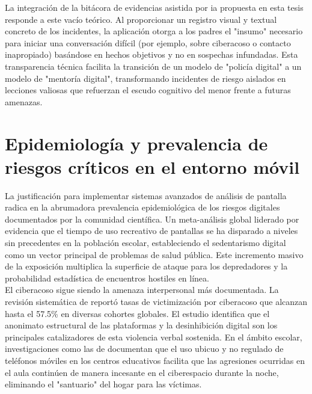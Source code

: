 La integración de la bitácora de evidencias asistida por \gls{ia} propuesta en esta tesis responde a este vacío teórico. Al proporcionar un registro visual y textual concreto de los incidentes, la aplicación otorga a los padres el "insumo" necesario para iniciar una conversación difícil (por ejemplo, sobre ciberacoso o contacto inapropiado) basándose en hechos objetivos y no en sospechas infundadas. Esta transparencia técnica facilita la transición de un modelo de "policía digital" a un modelo de "mentoría digital", transformando incidentes de riesgo aislados en lecciones valiosas que refuerzan el escudo cognitivo del menor frente a futuras amenazas.\\

\section{Epidemiología y prevalencia de riesgos críticos en el entorno móvil}

La justificación para implementar sistemas avanzados de análisis de pantalla radica en la abrumadora prevalencia epidemiológica de los riesgos digitales documentados por la comunidad científica. Un meta-análisis global liderado por \cite{mcarthur_global_2022} evidencia que el tiempo de uso recreativo de pantallas se ha disparado a niveles sin precedentes en la población escolar, estableciendo el sedentarismo digital como un vector principal de problemas de salud pública. Este incremento masivo de la exposición multiplica la superficie de ataque para los depredadores y la probabilidad estadística de encuentros hostiles en línea. \\

El ciberacoso sigue siendo la amenaza interpersonal más documentada. La revisión sistemática de \cite{zhu_cyberbullying_2021} reportó tasas de victimización por ciberacoso que alcanzan hasta el 57.5\% en diversas cohortes globales. El estudio identifica que el anonimato estructural de las plataformas y la desinhibición digital son los principales catalizadores de esta violencia verbal sostenida. En el ámbito escolar, investigaciones como las de \cite{kopecky_behaviour_2021} documentan que el uso ubicuo y no regulado de teléfonos móviles en los centros educativos facilita que las agresiones ocurridas en el aula continúen de manera incesante en el ciberespacio durante la noche, eliminando el "santuario" del hogar para las víctimas. \\



